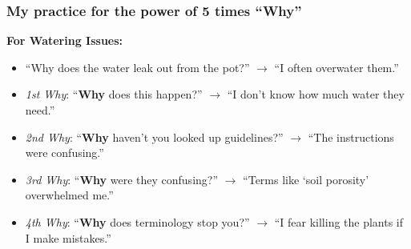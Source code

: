 \documentclass[math,code]{amznotes}
\theoremstyle{remark}
\begin{document}
\subsubsection{My practice for the power of 5 times ``Why''}
\textbf{For Watering Issues:}
\begin{itemize}
    \item ``Why does the water leak out from the pot?'' $\rightarrow$ ``I often overwater them.''
    \item \textit{1st Why}: ``\textbf{Why} does this happen?'' $\rightarrow$ ``I don’t know how much water they need.''
    \item \textit{2nd Why}: ``\textbf{Why} haven’t you looked up guidelines?'' $\rightarrow$ ``The instructions were confusing.''
    \item \textit{3rd Why}: ``\textbf{Why} were they confusing?'' $\rightarrow$ ``Terms like ‘soil porosity’ overwhelmed me.''
    \item \textit{4th Why}: ``\textbf{Why} does terminology stop you?'' $\rightarrow$ ``I fear killing the plants if I make mistakes.''
\end{itemize}
\end{document}
